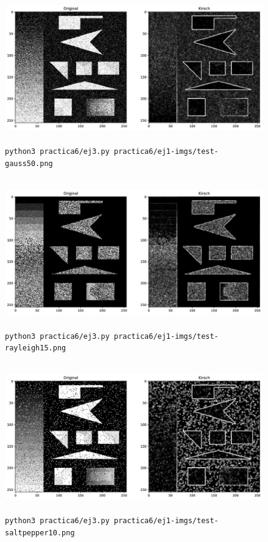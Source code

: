 \documentclass[11pt, spanish]{article}
\begin{document}
\begin{figure}[H]
\centering
    \includegraphics[height=6.5cm]{informe-imgs/ej3--test-gauss50.jpg}
    \caption{\texttt{python3 practica6/ej3.py practica6/ej1-imgs/test-gauss50.png }}
\end{figure}

\begin{figure}[H]
\centering
    \includegraphics[height=6.5cm]{informe-imgs/ej3--test-rayleigh15.jpg}
    \caption{\texttt{python3 practica6/ej3.py practica6/ej1-imgs/test-rayleigh15.png }}
\end{figure}

\begin{figure}[H]
\centering
    \includegraphics[height=6.5cm]{informe-imgs/ej3--test-saltpepper10.jpg}
    \caption{\texttt{python3 practica6/ej3.py practica6/ej1-imgs/test-saltpepper10.png }}
\end{figure}
\end{document}
